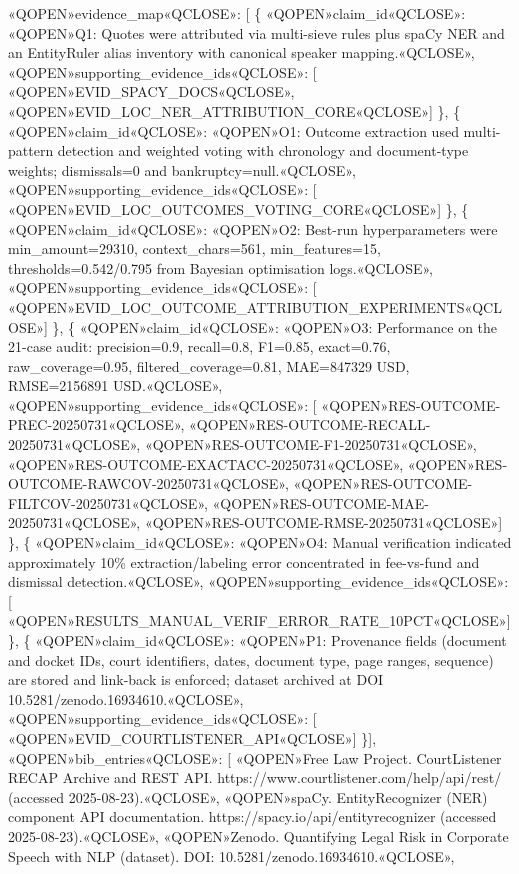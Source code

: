 «QOPEN»evidence\_map«QCLOSE»: {[}
\{
«QOPEN»claim\_id«QCLOSE»: «QOPEN»Q1: Quotes were attributed via multi-sieve rules plus spaCy NER and an EntityRuler alias inventory with canonical speaker mapping.«QCLOSE»,
«QOPEN»supporting\_evidence\_ids«QCLOSE»: {[}
«QOPEN»EVID\_SPACY\_DOCS«QCLOSE»,
«QOPEN»EVID\_LOC\_NER\_ATTRIBUTION\_CORE«QCLOSE»{]}
\},
\{
«QOPEN»claim\_id«QCLOSE»: «QOPEN»O1: Outcome extraction used multi-pattern detection and weighted voting with chronology and document-type weights; dismissals=0 and bankruptcy=null.«QCLOSE»,
«QOPEN»supporting\_evidence\_ids«QCLOSE»: {[}
«QOPEN»EVID\_LOC\_OUTCOMES\_VOTING\_CORE«QCLOSE»{]}
\},
\{
«QOPEN»claim\_id«QCLOSE»: «QOPEN»O2: Best-run hyperparameters were min\_amount=29310, context\_chars=561, min\_features=15, thresholds=0.542/0.795 from Bayesian optimisation logs.«QCLOSE»,
«QOPEN»supporting\_evidence\_ids«QCLOSE»: {[}
«QOPEN»EVID\_LOC\_OUTCOME\_ATTRIBUTION\_EXPERIMENTS«QCLOSE»{]}
\},
\{
«QOPEN»claim\_id«QCLOSE»: «QOPEN»O3: Performance on the 21-case audit: precision=0.9, recall=0.8, F1=0.85, exact=0.76, raw\_coverage=0.95, filtered\_coverage=0.81, MAE=847329 USD, RMSE=2156891 USD.«QCLOSE»,
«QOPEN»supporting\_evidence\_ids«QCLOSE»: {[}
«QOPEN»RES-OUTCOME-PREC-20250731«QCLOSE»,
«QOPEN»RES-OUTCOME-RECALL-20250731«QCLOSE»,
«QOPEN»RES-OUTCOME-F1-20250731«QCLOSE»,
«QOPEN»RES-OUTCOME-EXACTACC-20250731«QCLOSE»,
«QOPEN»RES-OUTCOME-RAWCOV-20250731«QCLOSE»,
«QOPEN»RES-OUTCOME-FILTCOV-20250731«QCLOSE»,
«QOPEN»RES-OUTCOME-MAE-20250731«QCLOSE»,
«QOPEN»RES-OUTCOME-RMSE-20250731«QCLOSE»{]}
\},
\{
«QOPEN»claim\_id«QCLOSE»: «QOPEN»O4: Manual verification indicated approximately 10\% extraction/labeling error concentrated in fee-vs-fund and dismissal detection.«QCLOSE»,
«QOPEN»supporting\_evidence\_ids«QCLOSE»: {[}
«QOPEN»RESULTS\_MANUAL\_VERIF\_ERROR\_RATE\_10PCT«QCLOSE»{]}
\},
\{
«QOPEN»claim\_id«QCLOSE»: «QOPEN»P1: Provenance fields (document and docket IDs, court identifiers, dates, document type, page ranges, sequence) are stored and link-back is enforced; dataset archived at DOI 10.5281/zenodo.16934610.«QCLOSE»,
«QOPEN»supporting\_evidence\_ids«QCLOSE»: {[}
«QOPEN»EVID\_COURTLISTENER\_API«QCLOSE»{]}
\}{]},
«QOPEN»bib\_entries«QCLOSE»: {[}
«QOPEN»Free Law Project. CourtListener RECAP Archive and REST API. https://www.courtlistener.com/help/api/rest/ (accessed 2025-08-23).«QCLOSE»,
«QOPEN»spaCy. EntityRecognizer (NER) component API documentation. https://spacy.io/api/entityrecognizer (accessed 2025-08-23).«QCLOSE»,
«QOPEN»Zenodo. Quantifying Legal Risk in Corporate Speech with NLP (dataset). DOI: 10.5281/zenodo.16934610.«QCLOSE»,
